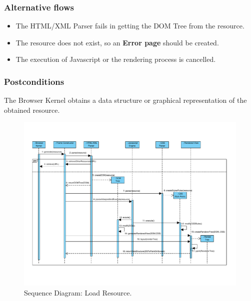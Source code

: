 \documentclass[prodmode,acmtecs]{acmsmall}
\begin{document}
\begin{shaded}
    \subsubsection*{Alternative flows} 
    \begin{itemize}\leftskip2.2em
    \item The HTML/XML Parser fails in getting the DOM Tree from the resource.
    \item The resource does not exist, so an \textbf{Error page} should be created. 
    \item The execution of Javascript or the rendering process is cancelled.
      \end{itemize}
    \subsubsection*{Postconditions} The Browser Kernel obtains a data structure or graphical representation of the obtained resource.

    \end{shaded}

    \begin{landscape}
      \begin{figure}[h!t]
      \vspace*{-2cm}
          \centering
          \hspace*{-1cm}\includegraphics[scale=0.8]{figures/LoadResource-v2.pdf}
          \vspace*{-2.2cm}
          \caption{Sequence Diagram: Load Resource.}
          \label{fig:LoadResource}
      \end{figure}
    \end{landscape}
\end{document}
